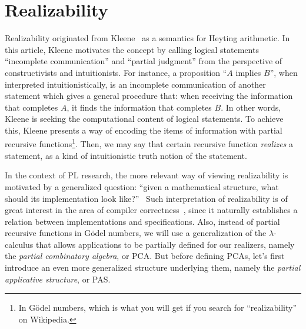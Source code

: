 \chapter{Realizability}

Realizability originated from Kleene~\citep{kleene45:interpretation_intuitionistic_number} as a semantics for Heyting arithmetic.  In this article, Kleene motivates the concept by calling logical statements ``incomplete communication'' and ``partial judgment'' from the perspective of constructivists and intuitionists.
For instance, a proposition ``\(A\) implies \(B\)'', when interpreted intuitionistically, is an incomplete communication of another statement which gives a general procedure that: when receiving the information that completes \(A\), it finds the information that completes \(B\).
In other words, Kleene is seeking the computational content of logical statements.
To achieve this, Kleene presents a way of encoding the items of information with partial recursive functions\footnote{In G\"odel numbers, which is what you will get if you search for ``realizability'' on Wikipedia.}.
Then, we may say that certain recursive function \emph{realizes} a statement, as a kind of intuitionistic truth notion of the statement.

In the context of PL research, the more relevant way of viewing realizability is motivated by a generalized question: ``given a mathematical structure, what should its implementation look like?''~\citep{bauer25:notes_realizability}
Such interpretation of realizability is of great interest in the area of compiler correctness~\citep{benton10:realizability_compositional_compiler, patterson22:interoperability_realizability_expressing}, since it naturally establishes a relation between implementations and specifications.
Also, instead of partial recursive functions in G\"odel numbers, we will use a generalization of the \(\lambda\)-calculus that allows applications to be partially defined for our realizers, namely the \emph{partial combinatory algebra}, or PCA.
But before defining PCAs, let's first introduce an even more generalized structure underlying them, namely the \emph{partial applicative structure}, or PAS.


